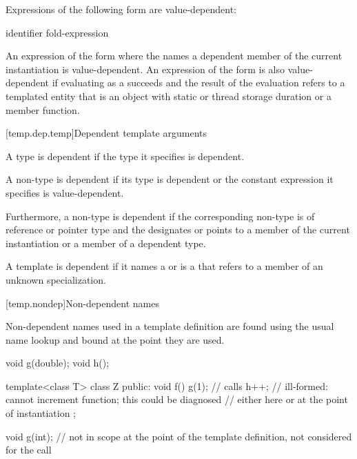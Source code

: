 \pnum
Expressions of the following form are value-dependent:

\begin{ncsimplebnf}
  \terminal{(} identifier \terminal{)}\br
fold-expression
\end{ncsimplebnf}

\pnum
An expression of the form \tcode{\&} where the
 names a dependent member of the current
instantiation is value-dependent.
An expression of the form \tcode{\&}
is also value-dependent if evaluating 
as a  succeeds and
the result of the evaluation refers to a templated entity
that is an object with static or thread storage duration or a member function.

[temp.dep.temp]{Dependent template arguments}

\pnum
A type
is dependent if the type it specifies is dependent.

\pnum
A non-type
is dependent if its type is dependent or the constant
expression it specifies is value-dependent.

\pnum
Furthermore, a non-type
is dependent if the corresponding non-type 
is of reference or pointer type and the 
designates or points to a member of the current instantiation or a member of
a dependent type.

\pnum
A template
is dependent if it names a
or is a
that refers to a member of an unknown specialization.

[temp.nondep]{Non-dependent names}

\pnum
Non-dependent names used in a template definition are found using the
usual name lookup and bound at the point they are used.
\begin{example}
\begin{codeblock}
void g(double);
void h();

template<class T> class Z {
public:
  void f() {
    g(1);           // calls 
    h++;            // ill-formed: cannot increment function; this could be diagnosed
                    // either here or at the point of instantiation
  }
};

void g(int);        // not in scope at the point of the template definition, not considered for the call 
\end{codeblock}
\end{example}

